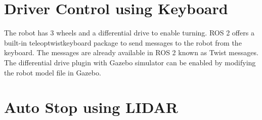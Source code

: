 \documentclass[%
xelatex,
	oneside,		%
	12pt,			%
	parskip=half,	%
	abstracton,
	chapterprefix=true%
    appendixprefix=true]
{scrbook}
\begin{document}
				\section{Driver Control using Keyboard}	
	\vspace*{0.5cm}
The robot has 3 wheels and a differential drive to enable turning. ROS 2 offers a built-in teleop\textunderscore twist\textunderscore keyboard package to send messages to the robot from the keyboard. The messages are already available in ROS 2 known as Twist messages. The differential drive plugin with Gazebo simulator can be enabled by modifying the robot model file in Gazebo. 	

		\section{Auto Stop using LIDAR}
		\vspace*{0.5cm}
		
\end{document}
